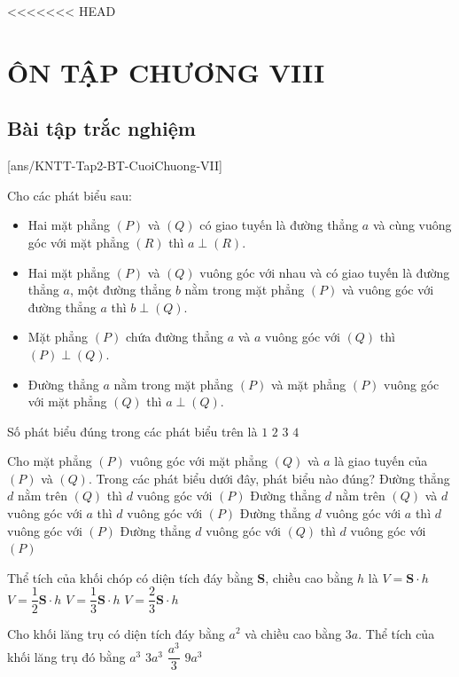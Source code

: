 <<<<<<< HEAD
\section*{ÔN TẬP CHƯƠNG VIII}
\subsection{Bài tập trắc nghiệm}
[ans/KNTT-Tap2-BT-CuoiChuong-VII]
\begin{ex}%
	Cho các phát biểu sau:
	\begin{itemize}
	\item Hai mặt phẳng $(P)$ và $(Q)$ có giao tuyến là đường thẳng $a$ và cùng vuông góc với mặt phẳng $(R)$ thì $a\perp(R)$.
	\item Hai mặt phẳng $(P)$ và $(Q)$ vuông góc với nhau và có giao tuyến là đường thẳng $a$, một đường thẳng $b$ nằm trong mặt phẳng $(P)$ và vuông góc với đường thẳng $a$ thì $b\perp(Q)$.
	\item Mặt phẳng $(P)$ chứa đường thẳng $a$ và $a$ vuông góc với $(Q)$ thì $(P)\perp(Q)$.
	\item Đường thẳng $a$ nằm trong mặt phẳng $(P)$ và mặt phẳng $(P)$ vuông góc với mặt phẳng $(Q)$ thì $a\perp(Q)$.
	\end{itemize}
	Số phát biểu đúng trong các phát biểu trên là
	\choice
	{$1$}
	{$2$}
	{\True $3$}
	{$4$} 
\end{ex}
\begin{ex}%
	Cho mặt phẳng $(P)$ vuông góc với mặt phẳng $(Q)$ và $a$ là giao tuyến của $(P)$ và $(Q)$. Trong các phát biểu dưới đây, phát biểu nào đúng?
	\choice
	{Đường thẳng $d$ nằm trên $(Q)$ thì $d$ vuông góc với $(P)$}
	{\True Đường thẳng $d$ nằm trên $(Q)$ và $d$ vuông góc với $a$ thì $d$ vuông góc với $(P)$}
	{Đường thẳng $d$ vuông góc với $a$ thì $d$ vuông góc với $(P)$}
	{Đường thẳng $d$ vuông góc với $(Q)$ thì $d$ vuông góc với $(P)$}
	\loigiai{}
\end{ex}
\begin{ex}%
	Thể tích của khối chóp có diện tích đáy bằng $\mathbf{S}$, chiều cao bằng $h$ là
	\choice
	{$V=\mathbf{S}\cdot h$}
	{$V=\dfrac{1}{2}\mathbf{S}\cdot h$}
	{\True $V=\dfrac{1}{3}\mathbf{S}\cdot h$}
	{$V=\dfrac{2}{3}\mathbf{S}\cdot h$}
	\loigiai{}
\end{ex}
\begin{ex}%
	Cho khối lăng trụ có diện tích đáy bằng $a^2$ và chiều cao bằng $3a$. Thể tích của khối lăng trụ đó bằng
	\choice
	{$a^3$}
	{\True $3a^3$}
	{$\dfrac{a^3}{3}$}
	{$9a^3$}
\end{ex}

